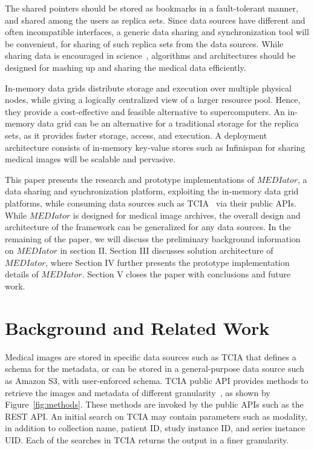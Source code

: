 \documentclass[letterpaper, 10 pt, conference]{ieeeconf}  %
\begin{document}
The shared pointers should be stored as bookmarks in a fault-tolerant manner, and shared among the users as replica sets. Since data sources have different and often incompatible interfaces, a generic data sharing and synchronization tool will be convenient, for sharing of such replica sets from the data sources. While sharing data is encouraged in science~\cite{szala2006science}, algorithms and architectures should be designed for mashing up and sharing the medical data efficiently. 
 
In-memory data grids distribute storage and execution over multiple physical nodes, while giving a logically centralized view of a larger resource pool. Hence, they provide a cost-effective and feasible alternative to supercomputers. An in-memory data grid can be an alternative for a traditional storage for the replica sets, as it provides faster storage, access, and execution. A deployment architecture consists of in-memory key-value stores such as Infinispan for sharing medical images will be scalable and pervasive.

This paper presents the research and prototype implementations of $MEDIator$, a data sharing and synchronization platform, exploiting the in-memory data grid platforms, while consuming data sources such as TCIA~\cite{prior2013tcia} via their public APIs. While $MEDIator$ is designed for medical image archives, the overall design and architecture of the framework can be generalized for any data sources. In the remaining of the paper, we will discuss the preliminary background information on $MEDIator$ in section II. Section III discusses solution architecture of $MEDIator$, where Section IV further presents the prototype implementation details of $MEDIator$. Section V closes the paper with conclusions and future work.

%
\section{Background and Related Work}
Medical images are stored in specific data sources such as TCIA that defines a schema for the metadata, or can be stored in a general-purpose data source such as Amazon S3, with user-enforced schema. TCIA public API provides methods to retrieve the images and metadata of different granularity~\cite{prior2013tcia}, as shown by Figure~\ref{fig:methods}. These methods are invoked by the public APIs such as the REST API. An initial search on TCIA may contain parameters such as modality, in addition to collection name, patient ID, study instance ID, and series instance UID. Each of the searches in TCIA returns the output in a finer granularity.
\end{document}
